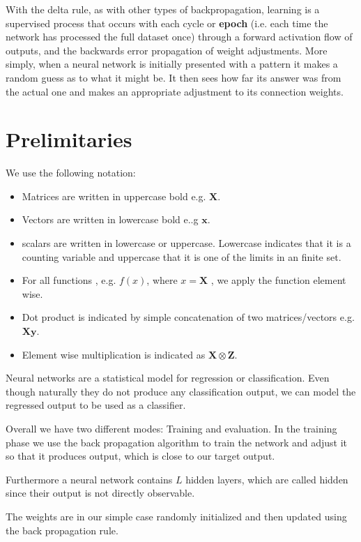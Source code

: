 \documentclass{acm_proc_article-sp}
\begin{document}
With the delta rule, as with other types of backpropagation, learning is a supervised process that occurs with each cycle or \textbf{epoch} (i.e. each time the network has processed the full dataset once) through a forward activation flow of outputs, and the backwards error propagation of weight adjustments. More simply, when a neural network is initially presented with a pattern it makes a random guess as to what it might be. It then sees how far its answer was from the actual one and makes an appropriate adjustment to its connection weights.

\section{Prelimitaries}


We use the following notation:
\begin{itemize}
\item Matrices are written in uppercase bold e.g. $\mathbf{X}$.
\item Vectors are written in lowercase bold e..g $\mathbf{x}$.
\item scalars are written in lowercase or uppercase. Lowercase indicates that it is a counting variable and uppercase that it is one of the limits in an finite set.
\item For all functions , e.g. $f(x)$, where $x = \mathbf{X}$ , we apply the function element wise.
\item Dot product is indicated by simple concatenation of two matrices/vectors e.g. $\mathbf{X} \mathbf{y}$.
\item Element wise multiplication is indicated as $\mathbf{X} \otimes \mathbf{Z}$.
\end{itemize}

Neural networks are a statistical model for regression or classification. Even though naturally they do not produce any classification output, we can model the regressed output to be used as a classifier.

Overall we have two different modes: Training and evaluation. In the training phase we use the back propagation algorithm to train the network and adjust it so that it produces output, which is close to our target output.

Furthermore a neural network contains $L$ hidden layers, which are called hidden since their output is not directly observable.

The weights are in our simple case randomly initialized and then updated using the back propagation rule.
\end{document}
